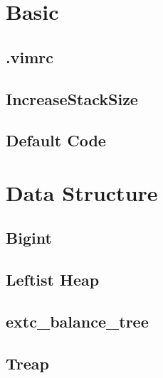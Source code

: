 \documentclass[10pt,twocolumn,oneside]{article}
\begin{document}
\pagestyle{fancy}
\fancyfoot{}
\fancyhead[R]{\thepage}
\renewcommand{\headrulewidth}{0.4pt}
\renewcommand{\contentsname}{Contents} 

\scriptsize
\tableofcontents
\section{Basic}
\subsection{.vimrc}


\newpage

\subsection{IncreaseStackSize}


\subsection{Default Code}

\newpage

\section{Data Structure}
\subsection{Bigint}


\subsection{Leftist Heap}


\subsection{extc\_balance\_tree}


\subsection{Treap}

\end{document}

